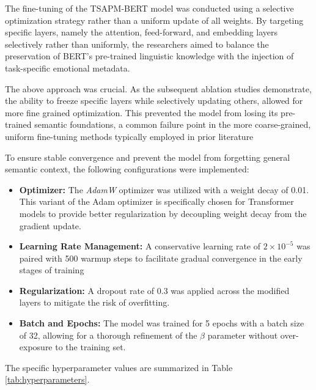 \documentclass[a4paper,12pt]{article}
\begin{document}
The fine-tuning of the TSAPM-BERT model was conducted using a selective optimization strategy rather than a uniform update of all weights. By targeting specific layers, namely the attention, feed-forward, and embedding layers selectively rather than uniformly, the researchers aimed to balance the preservation of BERT's pre-trained linguistic knowledge with the injection of task-specific emotional metadata.

The above approach was crucial. As the subsequent ablation studies demonstrate, the ability to freeze specific layers while selectively updating others, allowed for more fine grained optimization. This prevented the model from losing its pre-trained semantic foundations, a common failure point in the more coarse-grained, uniform fine-tuning methods typically employed in prior literature

To ensure stable convergence and prevent the model from forgetting general semantic context, the following configurations were implemented:

\begin{itemize}
    \item \textbf{Optimizer:} The \textit{AdamW} optimizer was utilized with a weight decay of 0.01. This variant of the Adam optimizer is specifically chosen for Transformer models to provide better regularization by decoupling weight decay from the gradient update.
    \item \textbf{Learning Rate Management:} A conservative learning rate of $2 \times 10^{-5}$ was paired with 500 warmup steps to facilitate gradual convergence in the early stages of training
    \item \textbf{Regularization:} A dropout rate of 0.3 was applied across the modified layers to mitigate the risk of overfitting.
    \item \textbf{Batch and Epochs:} The model was trained for 5 epochs with a batch size of 32, allowing for a thorough refinement of the $\beta$ parameter without over-exposure to the training set.
\end{itemize}

The specific hyperparameter values are summarized in Table \ref{tab:hyperparameters}.
\end{document}

